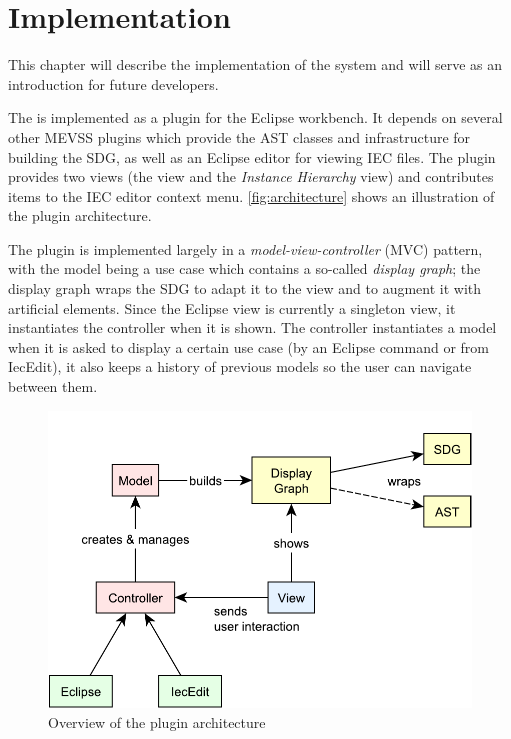 \chapter{Implementation} \label{ch:impl}

This chapter will describe the implementation of the system and will serve as an introduction for future developers.

The \SB is implemented as a plugin for the Eclipse workbench. It depends on several other MEVSS plugins which provide 
the AST classes and infrastructure for building the SDG, as well as an Eclipse editor for viewing IEC files. The \SB 
plugin provides two views (the \emph{\SB} view and the \emph{Instance Hierarchy} view) and contributes items to the IEC 
editor context menu. \autoref{fig:architecture} shows an illustration of the plugin architecture.

The plugin is implemented largely in a \emph{model-view-controller} (MVC) pattern, with the model being a use case 
which contains a so-called \emph{display graph}; the display graph wraps the SDG to adapt it to the view and to augment 
it with artificial elements. Since the Eclipse view is currently a singleton view, it instantiates the controller when 
it is shown. The controller instantiates a model when it is asked to display a certain use case (by an Eclipse command 
or from IecEdit), it also keeps a history of previous models so the user can navigate between them.

\begin{figure}[htb]
  \centering
    \includegraphics[scale=0.7]{bilder/architecture}
  \caption{Overview of the plugin architecture}
  \label{fig:architecture}
\end{figure}


